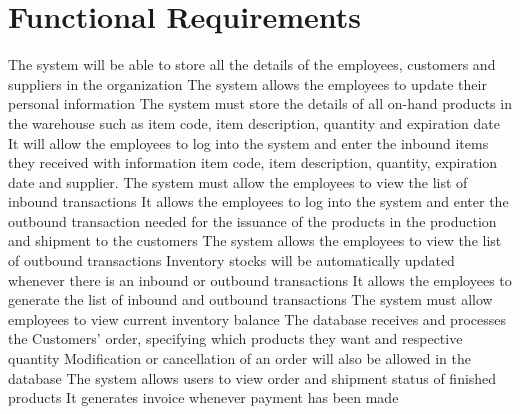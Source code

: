 \section{Functional Requirements}


The system will be able to store all the details of the employees, customers and suppliers in the organization
The system allows the employees to update their personal information
The system must store the details of all on-hand products in the warehouse such as item code, item description, quantity and expiration date
It will allow the employees to log into the system and enter the inbound items they received with information item code, item description, quantity, expiration date and supplier. 
The system must allow the employees to view the list of inbound transactions
It allows the employees to log into the system and enter the outbound transaction needed for the issuance of the products in the production and shipment to the customers
The system allows the employees to view the list of outbound transactions
Inventory stocks will be automatically updated whenever there is an inbound or outbound transactions
It allows the employees to generate the list of inbound and outbound transactions 
The system must allow employees to view current inventory balance
The database receives and processes the Customers’ order, specifying which products they want and respective quantity
Modification or cancellation of an order will also be allowed in the database
The system allows users to view order and shipment status of finished products
It generates invoice whenever payment has been made
